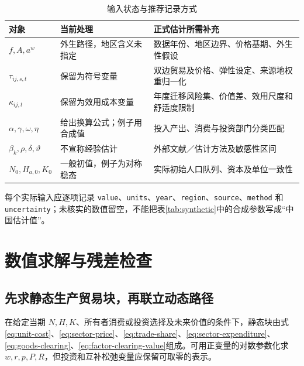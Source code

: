 \documentclass[UTF8,a4paper,zihao=-4,fontset=windows]{ctexart}
\numberwithin{equation}{section}
\begin{document}
{\small
\begin{table}[htbp]
\centering
\caption{输入状态与推荐记录方式}
\begin{tabularx}{\textwidth}{p{}YY}
\toprule 对象 & 当前处理 & 正式估计所需补充\\\midrule
$f,A,a^w$ & 外生路径，地区含义未指定 & 数据年份、地区边界、价格基期、外生性假设\\
$\tau_{ij,s,t}$ & 保留为符号变量 & 双边贸易及价格、弹性设定、来源地权重归一化\\
$\kappa_{ij,t}$ & 保留为效用成本变量 & 年度迁移风险集、价值差、效用尺度和舒适度限制\\
$\alpha,\gamma,\omega,\eta$ & 给出换算公式；例子用合成值 & 投入产出、消费与投资部门分类匹配\\
$\beta_k,\rho,\delta,\vartheta$ & 不宣称经验估计 & 外部文献／估计方法及敏感性区间\\
$N_0,H_{a,0},K_0$ & 一般初值，例子为对称稳态 & 实际初始人口队列、资本及单位一致性\\\bottomrule
\end{tabularx}
\end{table}}
每个实际输入应逐项记录 \texttt{value}、\texttt{units}、\texttt{year}、\texttt{region}、\texttt{source}、\texttt{method} 和 \texttt{uncertainty}；未核实的数值留空，不能把表\ref{tab:synthetic}中的合成参数写成“中国估计值”。

\section{数值求解与残差检查}
\label{sec:algorithm}

\subsection{先求静态生产贸易块，再联立动态路径}
在给定当期 $N,H,K$、所有者消费或投资选择及未来价值的条件下，静态块由式\eqref{eq:unit-cost}、\eqref{eq:sector-price}、\eqref{eq:trade-share}、\eqref{eq:sector-expenditure}、\eqref{eq:goods-clearing}、\eqref{eq:factor-clearing-value}组成。可用正变量的对数参数化求 $w,r,p,P,R$，但投资和互补松弛变量应保留可取零的表示。
\end{document}
